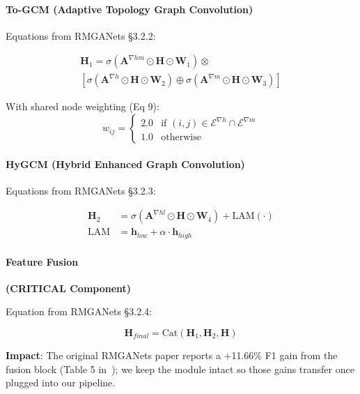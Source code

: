 \documentclass[11pt,a4paper]{article}
\begin{document}
\paragraph{To-GCM (Adaptive Topology Graph Convolution)}

Equations from RMGANets §3.2.2:

\begin{multline}
\mathbf{H}_1 = \sigma(\mathbf{A}^{\nabla hm} \odot \mathbf{H} \odot \mathbf{W}_1) \otimes \\
\left[\sigma(\mathbf{A}^{\nabla h} \odot \mathbf{H} \odot \mathbf{W}_2) \oplus \sigma(\mathbf{A}^{\nabla m} \odot \mathbf{H} \odot \mathbf{W}_3)\right] \tag{Eq 8}
\end{multline}

With shared node weighting (Eq 9):
\begin{equation}
w_{ij} = \begin{cases}
2.0 & \text{if } (i,j) \in \mathcal{E}^{\nabla h} \cap \mathcal{E}^{\nabla m} \\
1.0 & \text{otherwise}
\end{cases}
\end{equation}

\paragraph{HyGCM (Hybrid Enhanced Graph Convolution)}

Equations from RMGANets §3.2.3:

\begin{align}
\mathbf{H}_2 &= \sigma(\mathbf{A}^{\nabla hl} \odot \mathbf{H} \odot \mathbf{W}_4) + \text{LAM}(\cdot) \tag{Eq 10} \\
\text{LAM} &= \mathbf{h}_{low} + \alpha \cdot \mathbf{h}_{high} \tag{Eq 11}
\end{align}

\paragraph{Feature Fusion} \textbf{(CRITICAL Component)}

Equation from RMGANets §3.2.4:

\begin{equation}
\mathbf{H}_{final} = \text{Cat}(\mathbf{H}_1, \mathbf{H}_2, \mathbf{H}) \tag{Eq 12}
\end{equation}

\textbf{Impact}: The original RMGANets paper reports a +11.66\% F1 gain from the fusion block (Table 5 in~\cite{rmganets2024}); we keep the module intact so those gains transfer once plugged into our pipeline.
\end{document}
